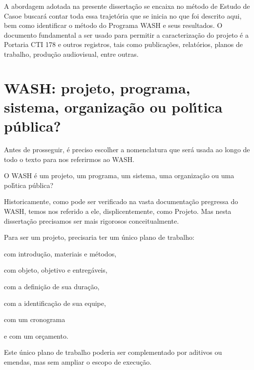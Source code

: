 \documentclass[
12pt,		%
openright,	%
twoside,  %
a4paper,			%
chapter=TITLE,		%
english,			%
french,				%
spanish,			%
brazil				%
]{USPSC-classe/USPSC}
\begin{document}
A abordagem adotada na presente disserta\c{c}\~ao se encaixa no m\'etodo de \textquotedbl Estudo de Caso\textquotedbl  e buscar\'a contar toda essa trajet\'oria que se inicia no que foi descrito aqui, bem como identificar o m\'etodo do Programa WASH e seus resultados. O documento fundamental a ser usado para permitir a caracteriza\c{c}\~ao do projeto \'e a Portaria CTI 178 e outros registros, tais como publica\c{c}\~oes, relat\'orios, planos de trabalho, produ\c{c}\~ao audiovisual, entre outras.




\section[WASH: projeto, programa, sistema, organiza\c{c}\~ao ou pol\'{\i}tica p\'ublica?]{WASH: projeto, programa, sistema, organiza\c{c}\~ao ou pol\'{\i}tica p\'ublica?}\label{WASH: projeto, programa, sistema, organiza\c{c}\~ao ou pol\'{\i}tica p\'ublica?}
Antes de prosseguir, \'e preciso escolher a nomenclatura que ser\'a usada ao longo de todo o texto para nos referirmos ao WASH.




O WASH \'e um projeto, um programa, um sistema, uma organiza\c{c}\~ao ou uma pol\'{\i}tica p\'ublica?




Historicamente, como pode ser verificado na vasta documenta\c{c}\~ao pregressa do WASH, temos nos referido a ele, displicentemente, como Projeto. Mas nesta disserta\c{c}\~ao precisamos ser mais rigorosos conceitualmente.




Para ser um projeto, precisaria ter um \'unico plano de trabalho:





\begin{alineas}
\item com introdu\c{c}\~ao, materiais e m\'etodos,
\item com objeto, objetivo e entreg\'aveis,
\item com a defini\c{c}\~ao de sua dura\c{c}\~ao,
\item com a identifica\c{c}\~ao de sua equipe,
\item com um cronograma
\item e com um or\c{c}amento.
\end{alineas}

Este \'unico plano de trabalho poderia ser complementado por aditivos ou emendas, mas sem ampliar o escopo de execu\c{c}\~ao.
\end{document}
